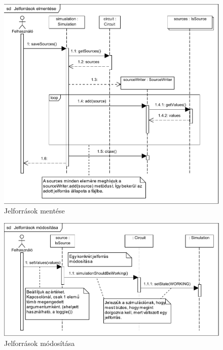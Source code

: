 \begin{figure}[H]
\begin{center}
\includegraphics{chapters/chapter03/seqdiagrams/jelforrasok_mentese.pdf}
\caption{Jelforrások mentése}
\label{fig:jelforrasok_mentese}
\end{center}
\end{figure}

\begin{figure}[H]
\begin{center}
\includegraphics{chapters/chapter03/seqdiagrams/jelforrasok_modositasa.pdf}
\caption{Jelforrások módosítása}
\label{fig:jelforrasok_modositasa}
\end{center}
\end{figure}


